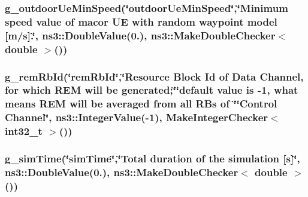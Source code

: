 \subsubsection[{\texorpdfstring{g\+\_\+outdoor\+Ue\+Min\+Speed}{g_outdoorUeMinSpeed}}]{ g\+\_\+outdoor\+Ue\+Min\+Speed(\char`\"{}outdoor\+Ue\+Min\+Speed\char`\"{},\char`\"{}Minimum {\bf speed} value of macor UE with random waypoint model \mbox{[}m/{\bf s}\mbox{]}.\char`\"{}, ns3\+::\+Double\+Value(0.), {\bf ns3\+::\+Make\+Double\+Checker}$<$ double $>$())\hspace{0.3cm}{\ttfamily [static]}}\hypertarget{lena-dual-stripe_8cc_a516de123a86d19d570680c8a5d24f485}{}\label{lena-dual-stripe_8cc_a516de123a86d19d570680c8a5d24f485}
\subsubsection[{\texorpdfstring{g\+\_\+rem\+Rb\+Id}{g_remRbId}}]{ g\+\_\+rem\+Rb\+Id(\char`\"{}rem\+Rb\+Id\char`\"{},\char`\"{}Resource Block Id of Data {\bf Channel}, for which R\+EM will be generated;\char`\"{}\char`\"{}default value is -\/1, what means R\+EM will be averaged {\bf from} {\bf all} R\+Bs of \char`\"{}\char`\"{}Control {\bf Channel}\char`\"{}, ns3\+::\+Integer\+Value(-\/1), Make\+Integer\+Checker$<$ int32\+\_\+t $>$())\hspace{0.3cm}{\ttfamily [static]}}\hypertarget{lena-dual-stripe_8cc_a7601ae78904d09cb834dafbebec56384}{}\label{lena-dual-stripe_8cc_a7601ae78904d09cb834dafbebec56384}
\subsubsection[{\texorpdfstring{g\+\_\+sim\+Time}{g_simTime}}]{ g\+\_\+sim\+Time(\char`\"{}sim\+Time\char`\"{},\char`\"{}Total duration of the simulation \mbox{[}{\bf s}\mbox{]}\char`\"{}, ns3\+::\+Double\+Value(0.), {\bf ns3\+::\+Make\+Double\+Checker}$<$ double $>$())\hspace{0.3cm}{\ttfamily [static]}}\hypertarget{lena-dual-stripe_8cc_abf302f6fd76a1dd9d34b22b9999f204a}{}\label{lena-dual-stripe_8cc_abf302f6fd76a1dd9d34b22b9999f204a}
